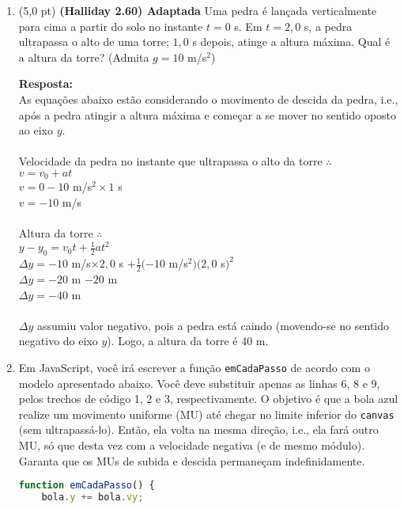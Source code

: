 \documentclass[12pt,a4paper,oneside]{article}
\begin{document}
\begin{enumerate}

	\item (5,0 pt) {\bf (Halliday 2.60) Adaptada} Uma pedra é lançada verticalmente para cima a partir do solo no instante $t = 0$ s. Em  $t  =2,0$ s, a pedra ultrapassa o alto de uma torre; $1,0$ s depois, atinge a altura máxima. Qual é a altura da torre? (Admita $g = 10$ m/s$^2$)
	
	{\color{blue} {\bf Resposta:} \\
		As equações abaixo estão considerando o movimento de descida da pedra, i.e., após a pedra atingir a altura máxima e começar a se mover no sentido oposto ao eixo $y$.\\
		\\
		Velocidade da pedra no instante que ultrapassa o alto da torre $\therefore$ \\
		$v = v_0 + at$\\
		$v = 0 -10$ m/s$^2 \times 1$ s\\
		$v = -10$ m/s\\
		\\
		Altura da torre $\therefore$\\
		$y - y_0 = v_0t + \frac{1}{2} a t^2$ \\
		$\Delta y = -10$ m/s$\times 2,0$ s $+\frac{1}{2} (-10$ m/s$^2)(2,0$ s$)^2$\\
		$\Delta y = -20$ m $-20$ m\\
		$\Delta y = -40$ m\\
		\\
		$\Delta y$ assumiu valor negativo, pois a pedra está caindo (movendo-se no sentido negativo do eixo $y$). Logo, a altura da torre é 40 m. 
	}

\newpage

	\item Em JavaScript, você irá escrever a função {\tt emCadaPasso} de acordo com o modelo apresentado abaixo. Você deve substituir apenas as linhas 6, 8 e 9, pelos trechos de código 1, 2 e 3, respectivamente. O objetivo é que a bola azul realize um movimento uniforme (MU) até chegar no limite inferior do {\tt canvas} (sem ultrapassá-lo). Então, ela volta na mesma direção, i.e., ela fará outro MU, só que desta vez com a velocidade negativa (e de mesmo módulo). Garanta que os MUs de subida e descida permaneçam indefinidamente.

\begin{lstlisting}[language=JavaScript]
function emCadaPasso() {    
	bola.y += bola.vy; 
	

\end{lstlisting}
\end{enumerate}
\end{document}
